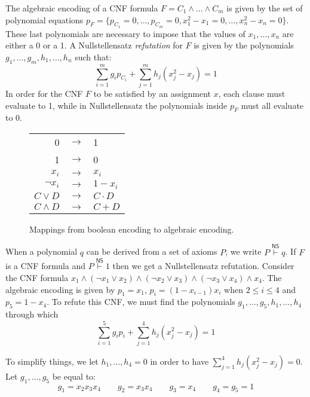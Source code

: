 The algebraic encoding of a CNF formula $F = C_1 \land \ldots \land C_m$ is given by the set of polynomial equations $p_F = \{p_{C_1} = 0, \ldots, p_{C_m} = 0, x_1^2-x_1 = 0, \ldots, x_n^2-x_n = 0\}$. These last polynomials are necessary to impose that the values of $x_1, \ldots, x_n$ are either a 0 or a 1. A Nullstellensatz \textit{refutation} for $F$ is given by the polynomials $g_1, \ldots, g_m, h_1, \ldots, h_n$ such that:
\[\sum_{i = 1}^m g_ip_{C_i} + \sum_{j = 1}^m h_j(x_j^2-x_j) = 1\]
In order for the CNF $F$ to be satisfied by an assignment $x$, each clause must evaluate to 1, while in Nullstellensatz the polynomials inside $p_F$ must all evaluate to 0. 

\begin{figure}[H]
    \centering
    \begin{tabular}{r c l}
 0 & $\longrightarrow$ & 1 \\
 1 & $\longrightarrow$ & 0 \\
        $x_i$ & $\longrightarrow$ & $x_i$ \\
        $\lnot x_i$ & $\longrightarrow$ & $1-x_i$ \\
        $C \lor D$ & $\longrightarrow$ & $C \cdot D$ \\
        $C \land D$ & $\longrightarrow$ & $C + D$ \\
    \end{tabular}

    \caption{Mappings from boolean encoding to algebraic encoding.}
\end{figure}

\noindent
When a polynomial $q$ can be derived from a set of axioms $P$, we write $P \stackrel{\mathsf{NS}}{\vdash} q$. If $F$ is a CNF formula and $P \stackrel{\mathsf{NS}}{\vdash} 1$ then we get a Nullstellensatz refutation. Consider the CNF formula $x_1 \land (\lnot x_1 \lor x_2) \land (\lnot x_2 \lor x_3) \land (\lnot x_3 \lor x_4)\land x_4$. The algebraic encoding is given by $p_1 = x_1$, $p_i = (1-x_{i-1})x_i$ when $2 \leq i \leq 4$ and $p_5 = 1-x_4$. To refute this CNF, we must find the polynomials $g_1, \ldots, g_5, h_1, \ldots, h_4$ through which
\[\sum_{i = 1}^5 g_ip_{i} + \sum_{j = 1}^4 h_j(x_j^2-x_j) = 1\]

\noindent
To simplify things, we let $h_1, \ldots, h_4 = 0$ in order to have $\sum_{j = 1}^4 h_j(x_j^2-x_j) = 0$. Let $g_1, \ldots, g_5$ be equal to:
\[g_1 = x_2x_3x_4 \qquad g_2 = x_3x_4 \qquad g_3 = x_4 \qquad g_4 = g_5 = 1\]

